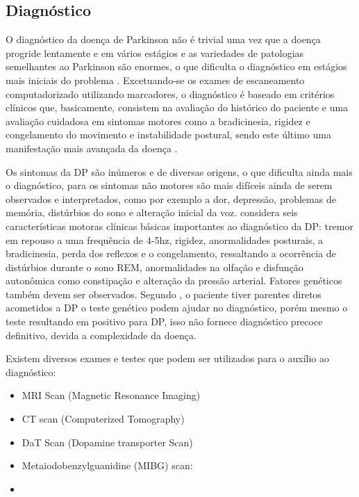 \documentclass[
	12pt,				%
	openany,			%
	oneside,			%
	a4paper,			%
	english,			%
	french,				%
	spanish,			%
	brazil				%
	]{abntex2}
\begin{document}
\subsection{Diagnóstico}

O diagnóstico da doença de Parkinson não é trivial uma vez que a doença progride lentamente e em vários estágios e as variedades de patologias semelhantes ao Parkinson são enormes, o que dificulta o diagnóstico em estágios mais iniciais do problema \cite{ebook2016}. Excetuando-se os exames de escaneamento computadorizado utilizando marcadores, o diagnóstico é baseado em critérios clínicos que, basicamente, consistem na avaliação do histórico do paciente e uma avaliação cuidadosa em sintomas motores como a bradicinesia, rigidez e congelamento do movimento e instabilidade postural, sendo este último uma manifestação mais avançada da doença \cite{kalia2015}.

Os sintomas da DP são inúmeros e de diversas origens, o que dificulta ainda mais o diagnóstico, para  os sintomas não motores são mais difíceis ainda de serem observados e interpretados, como por exemplo a dor, depressão, problemas de memória, distúrbios do sono e alteração inicial da voz.  considera seis características motoras clínicas básicas importantes ao diagnóstico da DP: tremor em repouso a uma frequência de 4-5hz, rigidez, anormalidades posturais, a bradicinesia, perda dos reflexos e o congelamento, ressaltando a ocorrência de distúrbios durante o sono REM, anormalidades na olfação e disfunção autonômica como constipação e alteração da pressão arterial. Fatores genéticos também devem ser observados. Segundo , o paciente tiver parentes diretos acometidos a DP o teste genético podem ajudar no diagnóstico, porém mesmo o teste resultando em positivo para DP, isso não fornece diagnóstico precoce definitivo, devida a complexidade da doença. 

Existem diversos exames e testes que podem ser utilizados para o auxílio ao diagnóstico:

\begin{itemize}
	\item MRI Scan (Magnetic Resonance Imaging)
	\item CT scan (Computerized Tomography)
	\item DaT Scan (Dopamine transporter Scan)
	\item Metaiodobenzylguanidine (MIBG) scan:
	\item
\end{itemize}
\end{document}
